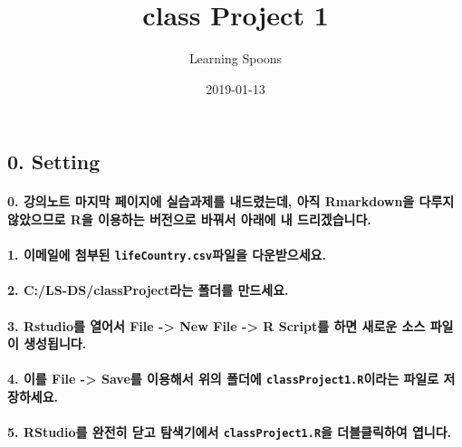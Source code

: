 \documentclass[a4paper]{article}
\title{class Project 1}
\author{Learning Spoons}
\date{2019-01-13}
\let\oldparagraph\paragraph
\renewcommand{\paragraph}[1]{\oldparagraph{#1}\mbox{}}
\begin{document}
\maketitle

\subsection{0. Setting}\label{setting}

\paragraph{0. 강의노트 마지막 페이지에 실습과제를 내드렸는데, 아직
Rmarkdown을 다루지 않았으므로 R을 이용하는 버전으로 바꿔서 아래에 내
드리겠습니다.}\label{------rmarkdown---r------.}

\paragraph{\texorpdfstring{1. 이메일에 첨부된
\texttt{lifeCountry.csv}파일을
다운받으세요.}{1. 이메일에 첨부된 lifeCountry.csv파일을 다운받으세요.}}\label{--lifecountry.csv-.}

\paragraph{2. C:/LS-DS/classProject라는 폴더를
만드세요.}\label{cls-dsclassproject--.}

\paragraph{3. Rstudio를 열어서 File -\textgreater{} New File
-\textgreater{} R Script를 하면 새로운 소스 파일이
생성됩니다.}\label{rstudio--file---new-file---r-script-----.}

\paragraph{\texorpdfstring{4. 이를 File -\textgreater{} Save를 이용해서
위의 폴더에 \texttt{classProject1.R}이라는 파일로
저장하세요.}{4. 이를 File -\textgreater{} Save를 이용해서 위의 폴더에 classProject1.R이라는 파일로 저장하세요.}}\label{-file---save----classproject1.r--.}

\paragraph{\texorpdfstring{5. RStudio를 완전히 닫고 탐색기에서
\texttt{classProject1.R}을 더블클릭하여
엽니다.}{5. RStudio를 완전히 닫고 탐색기에서 classProject1.R을 더블클릭하여 엽니다.}}\label{rstudio----classproject1.r--.}
\end{document}
